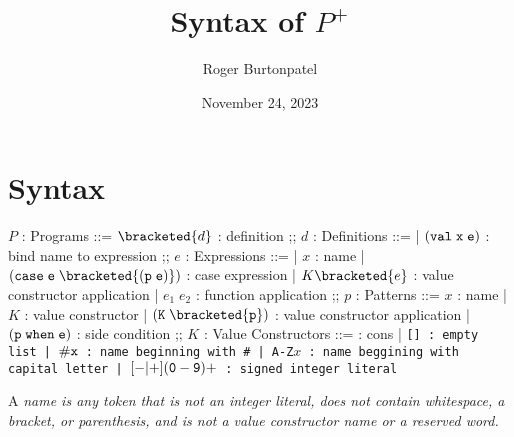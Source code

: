 \documentclass[]{article}
\title{Syntax of $P^{+}$}
\author{Roger Burtonpatel}
\date{November 24, 2023}
\begin{document}
\maketitle

\newcommand\la{\langle}
\newcommand\ra{\rangle}
\def\<#1>{\synt{#1}}

\newcommand\B[1]{\synt{#1}}

\section{Syntax}

\bigskip 
\begin{center}
    \begin{bnf}

    $P$ : \textsf{Programs} ::=
    $\bracketed{d}$ : definition
    ;;
    $d$ : \textsf{Definitions} ::=
    | $\tt{(val} \; x \; e\tt{)}$ : bind name to expression
    ;;
    $e$ : \textsf{Expressions} ::=
    | $x$ : name
    | $\tt{(case} \; e \; \bracketed{\tt{(} p \; e \tt{)}} \tt{)}$ : case expression 
    | $K \bracketed{e}$ : value constructor application 
    | $e_1 \; e_2$ : function application 
    ;;
    $p$ : \textsf{Patterns} ::= $x$ : name 
    | $K$ : value constructor 
    | $\tt{(}K \; \bracketed{p}\tt{)}$ : value constructor application 
    | $\tt{(}p \; \tt{when} \; e \tt{)}$ : side condition
    ;;
    $K$ : \textsf{Value Constructors} ::=
    \cons : cons 
    | \tt{[]} : empty list 
    | $\tt{\#}x$ : name beginning with \tt{\#}
    | \tt{A-Z}$x$ : name beggining with capital letter
    | $[\tt{-}\vert\tt{+}](\tt{0}-\tt{9})+$ : signed integer literal 

    \end{bnf}
\end{center}
\bigskip 

A \it{name} is any token that is not an integer literal, 
does not contain whitespace, a bracket, or parenthesis, 
and is not a value constructor name or a reserved word.

\bigskip



    
    
\end{document}
